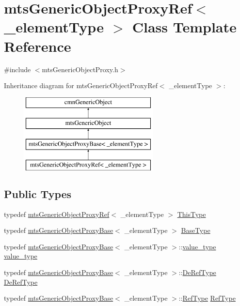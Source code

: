 \hypertarget{classmts_generic_object_proxy_ref}{}\section{mts\+Generic\+Object\+Proxy\+Ref$<$ \+\_\+element\+Type $>$ Class Template Reference}
\label{classmts_generic_object_proxy_ref}


{\ttfamily \#include $<$mts\+Generic\+Object\+Proxy.\+h$>$}

Inheritance diagram for mts\+Generic\+Object\+Proxy\+Ref$<$ \+\_\+element\+Type $>$\+:\begin{figure}[H]
\begin{center}
\leavevmode
\includegraphics[height=4.000000cm]{dc/d4f/classmts_generic_object_proxy_ref}
\end{center}
\end{figure}
\subsection*{Public Types}
\begin{DoxyCompactItemize}
\item 
typedef \hyperlink{classmts_generic_object_proxy_ref}{mts\+Generic\+Object\+Proxy\+Ref}$<$ \+\_\+element\+Type $>$ \hyperlink{classmts_generic_object_proxy_ref_a02e3c6255922d05f1fc627ee67dd3bd9}{This\+Type}
\item 
typedef \hyperlink{classmts_generic_object_proxy_base}{mts\+Generic\+Object\+Proxy\+Base}$<$ \+\_\+element\+Type $>$ \hyperlink{classmts_generic_object_proxy_ref_a52a477c15ddc935700cf9fdbe9da0dcf}{Base\+Type}
\item 
typedef \hyperlink{classmts_generic_object_proxy_base}{mts\+Generic\+Object\+Proxy\+Base}$<$ \+\_\+element\+Type $>$\+::\hyperlink{classmts_generic_object_proxy_ref_af50eac4bbf86d9609d7cd77c33d4bf54}{value\+\_\+type} \hyperlink{classmts_generic_object_proxy_ref_af50eac4bbf86d9609d7cd77c33d4bf54}{value\+\_\+type}
\item 
typedef \hyperlink{classmts_generic_object_proxy_base}{mts\+Generic\+Object\+Proxy\+Base}$<$ \+\_\+element\+Type $>$\+::\hyperlink{classmts_generic_object_proxy_base_ac87827bf98fee558160a8985c41f4126}{De\+Ref\+Type} \hyperlink{classmts_generic_object_proxy_ref_af6b06c46f460ed5aca8fbe05ab6bde61}{De\+Ref\+Type}
\item 
typedef \hyperlink{classmts_generic_object_proxy_base}{mts\+Generic\+Object\+Proxy\+Base}$<$ \+\_\+element\+Type $>$\+::\hyperlink{classmts_generic_object_proxy_base_adddd01c8aea004bf5f0a5894438970c9}{Ref\+Type} \hyperlink{classmts_generic_object_proxy_ref_a2b4ed89cb2db6ed1dd47d1352ada6be8}{Ref\+Type}
\end{DoxyCompactItemize}
